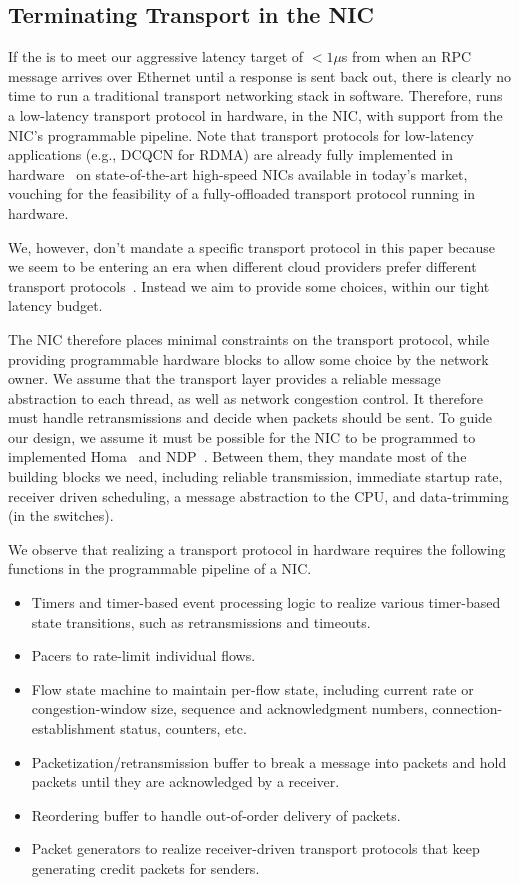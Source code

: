 \subsection{Terminating Transport in the NIC}
\label{ssec:nic-transport}
If the \name{} is to meet our aggressive latency target of $<1\mu$s from when an RPC message arrives over Ethernet until a response is sent back out, there is clearly no time to run a traditional transport networking stack in software. Therefore, \name{} runs a low-latency transport protocol in hardware, in the NIC, with support from the NIC's programmable pipeline. Note that transport protocols for low-latency applications (e.g., DCQCN for RDMA) are already fully implemented in hardware~\cite{cvl,connectx6} on state-of-the-art high-speed NICs available in today's market, vouching for the feasibility of a fully-offloaded transport protocol running in hardware.

We, however, don't mandate a specific transport protocol in this paper because we seem to be entering an era when different cloud providers prefer different transport protocols~\cite{timely,hpcc,dcqcn}. Instead we aim to provide some choices, within our tight latency budget.

The NIC therefore places minimal constraints on the transport protocol, while providing programmable hardware blocks to allow some choice by the network owner. We assume that the transport layer provides a reliable message abstraction to each thread, as well as network congestion control. It therefore must handle retransmissions and decide when packets should be sent. To guide our design, we assume it must be possible for the NIC to be programmed to implemented Homa~\cite{homa} and NDP~\cite{ndp}. Between them, they mandate most of the building blocks we need, including reliable transmission, immediate startup rate, receiver driven scheduling, a message abstraction to the CPU, and data-trimming (in the switches).

We observe that realizing a transport protocol in hardware requires the following functions in the programmable pipeline of a NIC.

\begin{itemize}
    \item Timers and timer-based event processing logic to realize various timer-based state transitions, such as retransmissions and timeouts.
    \item Pacers to rate-limit individual flows.
    \item Flow state machine to maintain per-flow state, including current rate or congestion-window size, sequence and acknowledgment numbers, connection-establishment status, counters, etc.
    \item Packetization/retransmission buffer to break a message into packets and hold packets until they are acknowledged by a receiver.
    \item Reordering buffer to handle out-of-order delivery of packets.
    \item Packet generators to realize receiver-driven transport protocols that keep generating credit packets for senders.
\end{itemize}

